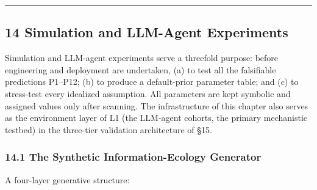 \documentclass[
  11pt]{article}
\begin{document}
\begin{center}\rule{0.5\linewidth}{0.5pt}\end{center}

\subsection{14 Simulation and LLM-Agent
Experiments}\label{simulation-and-llm-agent-experiments}

Simulation and LLM-agent experiments serve a threefold purpose: before
engineering and deployment are undertaken, (a) to test all the
falsifiable predictions P1--P12; (b) to produce a default-prior
parameter table; and (c) to stress-test every idealized assumption. All
parameters are kept symbolic and assigned values only after scanning.
The infrastructure of this chapter also serves as the environment layer
of L1 (the LLM-agent cohorts, the primary mechanistic testbed) in the
three-tier validation architecture of §15.

\subsubsection{14.1 The Synthetic Information-Ecology
Generator}\label{the-synthetic-information-ecology-generator}

A four-layer generative structure:
\end{document}
